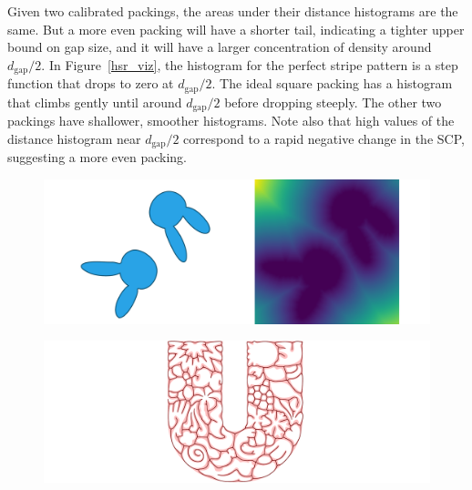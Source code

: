 Given two calibrated packings, the areas under their distance histograms
are the same.  But a more even packing will have a shorter tail,
indicating a tighter upper bound on gap size, and it will have a larger
concentration of density around $d_\mathrm{gap}/2$.  In Figure~\ref{hsr_viz},
the histogram for the perfect stripe pattern is a step function that drops
to zero at $d_\mathrm{gap}/2$.  The ideal square packing has a histogram
that climbs gently until around $d_\mathrm{gap}/2$ before dropping
steeply.  The other two packings have shallower, smoother histograms.
Note also that high values of the distance histogram near $d_\mathrm{gap}/2$
correspond to a rapid negative change in the SCP, suggesting a more even
packing.

\begin{figure}[t]
\centering
\includegraphics[width=1.0\textwidth]{figures/metrics/rabbit.pdf}
\caption[An example of distance transform of negative space]
{\label{fig_distance_transform}
  }
\end{figure}

\begin{figure}[t]
\centering
\includegraphics[width=1.0\textwidth]{figures/metrics/unilever_with_skeleton_small.pdf}
\caption[An example of a skeleton of negative space]
{\label{fig_skeleton}
}
\end{figure}

